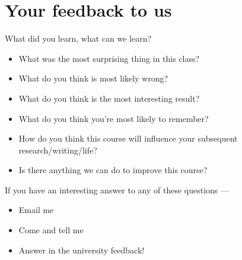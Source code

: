 \section{Your feedback to us}

\begin{frame}{What did you learn, what can we learn?}
  
\begin{itemize}
\item What was the most surprising thing in this 
class?
\item What do you think is most likely wrong?
\item What do you think is the most interesting result?
\item What do you think you’re most likely to remember?
\item How do you think this course will influence 
your subsequent research/writing/life?
\item Is there anything we can do to improve this course?
\end{itemize}

\bigskip

If you have an interesting answer to any of these questions ---
\medskip
\begin{itemize}
\item Email me 
\item Come and tell me 
\item Answer in the university feedback!
\end{itemize}


\end{frame}
